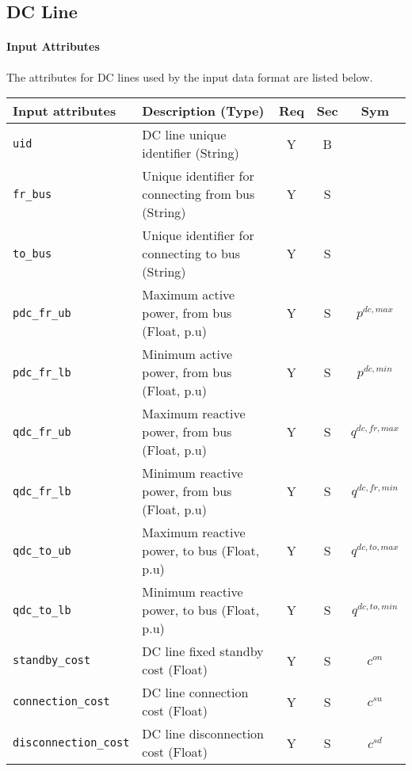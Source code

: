 \documentclass{article}
\begin{document}
     


  
\subsection{DC Line}
\label{nom:dcline}

\paragraph{Input Attributes}
The attributes for DC lines 
used by the input data format are listed below.

\begin{center}
\small
\begin{tabular}{ l | l | c | c | c |}
Input attributes & Description (Type) & Req & Sec & Sym\\
\hline
  {\tt uid} & DC line unique identifier (String)& Y & B &  \\
  {\tt fr\_bus} & Unique identifier for connecting from bus (String) & Y & S & \\
  {\tt to\_bus} & Unique identifier for connecting to bus (String)& Y & S & \\
  {\tt pdc\_fr\_ub} & Maximum active power, from bus (Float, p.u)& Y & S & $p^{dc,max}$\\
  {\tt pdc\_fr\_lb} & Minimum active power, from bus (Float, p.u)& Y & S & $p^{dc,min}$\\
  {\tt qdc\_fr\_ub} & Maximum reactive power, from bus (Float, p.u)& Y & S & $q^{dc,fr,max}$\\
  {\tt qdc\_fr\_lb} & Minimum reactive power, from bus (Float, p.u)& Y & S & $q^{dc,fr,min}$\\
  {\tt qdc\_to\_ub} & Maximum reactive power, to bus (Float, p.u)& Y & S & $q^{dc,to,max}$\\
  {\tt qdc\_to\_lb} & Minimum reactive power, to bus (Float, p.u)& Y & S & $q^{dc,to,min}$\\
   {\tt standby\_cost} & {DC line fixed standby cost (Float)} & Y & S & $c^{on}$\\  
  {\tt connection\_cost} & {DC line connection cost (Float)} & Y & S & $c^{su}$\\        
  {\tt disconnection\_cost} & {DC line disconnection cost (Float)} & Y & S & $c^{sd}$\\     
  \hline
\end{tabular}
\end{center}    
\end{document}
